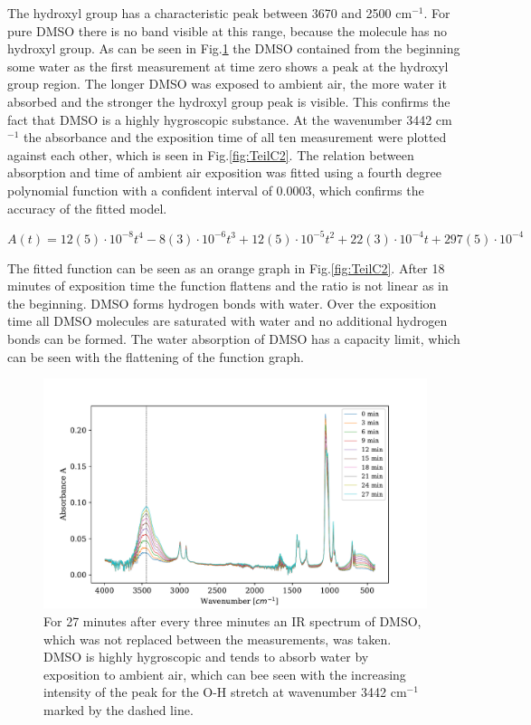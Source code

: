 \documentclass[a4paper,abstracton]{article}	                       %
\renewcommand{\cite}{\supercite}						%
\begin{document}
The hydroxyl group has a characteristic peak between 3670 and 2500 cm$^{-1}$\cite{assignment}. For pure DMSO there is no band visible at this range, because the molecule has no hydroxyl group. As can be seen in Fig.\ref{fig:TeilC1} the DMSO contained from the beginning some water as the first measurement at time zero shows a peak at the hydroxyl group region.
The longer DMSO was exposed to ambient air, the more water it absorbed and the stronger the hydroxyl group peak is visible. This confirms the fact that DMSO is a highly hygroscopic substance\cite{DMSO}. At the wavenumber 3442 cm$^{-1}$ the absorbance and the exposition time of all ten measurement were plotted against each other, which is seen in Fig.\ref{fig:TeilC2}. The relation between absorption and time of ambient air exposition was fitted using a fourth degree polynomial function with a confident interval of 0.0003, which confirms the accuracy of the fitted model.

\begin{equation}\label{eq:A(t)}
   {A(t)} = 12(5)\cdot10^{-8} t^{4} - 8(3)\cdot10^{-6}t^{3} + 12(5)\cdot10^{-5}t^{2} + 22(3)\cdot10^{-4} t + 297(5) \cdot10^{-4}
\end{equation}

The fitted function can be seen as an orange graph in Fig.\ref{fig:TeilC2}. After 18 minutes of exposition time the function flattens and the ratio is not linear as in the beginning. DMSO forms hydrogen bonds with water. Over the exposition time all DMSO molecules are saturated with water and no additional hydrogen bonds can be formed. The water absorption of DMSO has a capacity limit, which can be seen with the flattening of the function graph. 

\begin{figure}[H]
\centering
 \includegraphics[width=\textwidth] {TeilC1.pdf}
\caption{\label{fig:TeilC1} For 27 minutes after every three minutes an IR spectrum of DMSO, which was not replaced between the measurements, was taken. DMSO is highly hygroscopic and tends to absorb water by exposition to ambient air, which can bee seen with the increasing intensity of the peak for the O-H stretch at wavenumber 3442 cm$^{-1}$ marked by the dashed line.} 
\end{figure}
\end{document}
